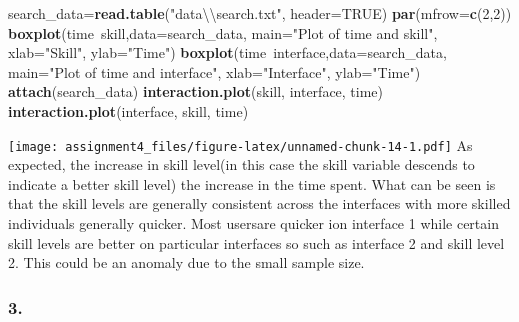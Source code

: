 \documentclass[11pt,]{article}
\newenvironment{Shaded}{\begin{snugshade}}{\end{snugshade}}
\newcommand{\KeywordTok}[1]{\textcolor[rgb]{0.13,0.29,0.53}{\textbf{{#1}}}}
\newcommand{\DataTypeTok}[1]{\textcolor[rgb]{0.13,0.29,0.53}{{#1}}}
\newcommand{\DecValTok}[1]{\textcolor[rgb]{0.00,0.00,0.81}{{#1}}}
\newcommand{\CharTok}[1]{\textcolor[rgb]{0.31,0.60,0.02}{{#1}}}
\newcommand{\StringTok}[1]{\textcolor[rgb]{0.31,0.60,0.02}{{#1}}}
\newcommand{\OtherTok}[1]{\textcolor[rgb]{0.56,0.35,0.01}{{#1}}}
\newcommand{\NormalTok}[1]{{#1}}
\begin{document}
\begin{Shaded}
\begin{Highlighting}[]
\NormalTok{search_data=}\KeywordTok{read.table}\NormalTok{(}\StringTok{"data}\CharTok{\textbackslash{}\textbackslash{}}\StringTok{search.txt"}\NormalTok{, }\DataTypeTok{header=}\OtherTok{TRUE}\NormalTok{)}
\KeywordTok{par}\NormalTok{(}\DataTypeTok{mfrow=}\KeywordTok{c}\NormalTok{(}\DecValTok{2}\NormalTok{,}\DecValTok{2}\NormalTok{))}
\KeywordTok{boxplot}\NormalTok{(time~skill,}\DataTypeTok{data=}\NormalTok{search_data, }\DataTypeTok{main=}\StringTok{"Plot of time and skill"}\NormalTok{, }
    \DataTypeTok{xlab=}\StringTok{"Skill"}\NormalTok{, }\DataTypeTok{ylab=}\StringTok{"Time"}\NormalTok{)}
\KeywordTok{boxplot}\NormalTok{(time~interface,}\DataTypeTok{data=}\NormalTok{search_data, }\DataTypeTok{main=}\StringTok{"Plot of time and interface"}\NormalTok{, }
    \DataTypeTok{xlab=}\StringTok{"Interface"}\NormalTok{, }\DataTypeTok{ylab=}\StringTok{"Time"}\NormalTok{)}
\KeywordTok{attach}\NormalTok{(search_data)}
\KeywordTok{interaction.plot}\NormalTok{(skill, interface, time)}
\KeywordTok{interaction.plot}\NormalTok{(interface, skill, time)}
\end{Highlighting}
\end{Shaded}

\texttt{[image: assignment4\_files/figure-latex/unnamed-chunk-14-1.pdf]}
As expected, the increase in skill level(in this case the skill variable
descends to indicate a better skill level) the increase in the time
spent. What can be seen is that the skill levels are generally
consistent across the interfaces with more skilled individuals generally
quicker. Most usersare quicker ion interface 1 while certain skill
levels are better on particular interfaces so such as interface 2 and
skill level 2. This could be an anomaly due to the small sample size.

\subsubsection{3.}\label{section-7}
\end{document}
